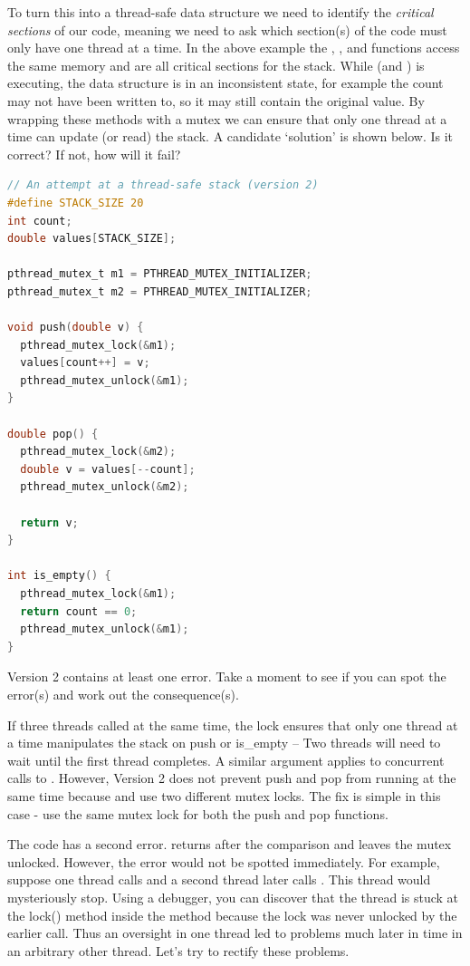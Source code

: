 To turn this into a thread-safe data structure we need to identify the \emph{critical sections} of our code, meaning we need to ask which section(s) of the code must only have one thread at a time.
In the above example the , , and  functions access the same memory and are all critical sections for the stack.
While  (and ) is executing, the data structure is in an inconsistent state, for example the count may not have been written to, so it may still contain the original value.
By wrapping these methods with a mutex we can ensure that only one thread at a time can update (or read) the stack.
A candidate `solution' is shown below.
Is it correct?
If not, how will it fail?

\begin{lstlisting}[language=C]
// An attempt at a thread-safe stack (version 2)
#define STACK_SIZE 20
int count;
double values[STACK_SIZE];

pthread_mutex_t m1 = PTHREAD_MUTEX_INITIALIZER;
pthread_mutex_t m2 = PTHREAD_MUTEX_INITIALIZER;

void push(double v) {
  pthread_mutex_lock(&m1);
  values[count++] = v;
  pthread_mutex_unlock(&m1);
}

double pop() {
  pthread_mutex_lock(&m2);
  double v = values[--count];
  pthread_mutex_unlock(&m2);

  return v;
}

int is_empty() {
  pthread_mutex_lock(&m1);
  return count == 0;
  pthread_mutex_unlock(&m1);
}
\end{lstlisting}

Version 2 contains at least one error.
Take a moment to see if you can spot the error(s) and work out the consequence(s).

If three threads called  at the same time, the lock  ensures that only one thread at a time manipulates the stack on push or is\_empty -- Two threads will need to wait until the first thread completes.
A similar argument applies to concurrent calls to .
However, Version 2 does not prevent push and pop from running at the same time because  and  use two different mutex locks.
The fix is simple in this case - use the same mutex lock for both the push and pop functions.

The code has a second error.
 returns after the comparison and leaves the mutex unlocked.
However, the error would not be spotted immediately.
For example, suppose one thread calls  and a second thread later calls .
This thread would mysteriously stop.
Using a debugger, you can discover that the thread is stuck at the lock() method inside the  method because the lock was never unlocked by the earlier  call.
Thus an oversight in one thread led to problems much later in time in an arbitrary other thread.
Let's try to rectify these problems.

